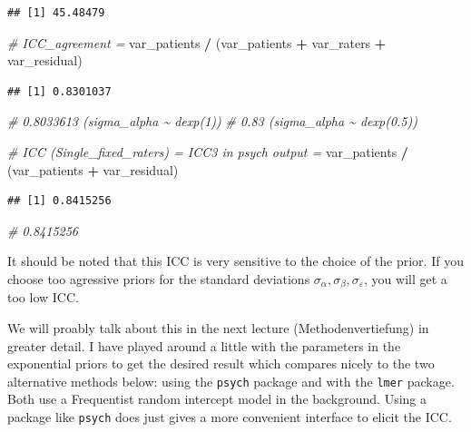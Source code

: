 \documentclass[
]{book}
\newenvironment{Shaded}{\begin{snugshade}}{\end{snugshade}}
\newcommand{\CommentTok}[1]{\textcolor[rgb]{0.56,0.35,0.01}{\textit{#1}}}
\newcommand{\NormalTok}[1]{#1}
\newcommand{\SpecialCharTok}[1]{\textcolor[rgb]{0.81,0.36,0.00}{\textbf{#1}}}
\begin{document}
\begin{verbatim}
## [1] 45.48479
\end{verbatim}

\begin{Shaded}
\begin{Highlighting}[]
\CommentTok{\# ICC\_agreement = }
\NormalTok{var\_patients }\SpecialCharTok{/}\NormalTok{ (var\_patients }\SpecialCharTok{+}\NormalTok{ var\_raters }\SpecialCharTok{+}\NormalTok{ var\_residual)}
\end{Highlighting}
\end{Shaded}

\begin{verbatim}
## [1] 0.8301037
\end{verbatim}

\begin{Shaded}
\begin{Highlighting}[]
\CommentTok{\# 0.8033613 (sigma\_alpha \textasciitilde{} dexp(1))}
\CommentTok{\# 0.83 (sigma\_alpha \textasciitilde{} dexp(0.5))}

\CommentTok{\# ICC (Single\_fixed\_raters) = ICC3 in psych output = }
\NormalTok{var\_patients }\SpecialCharTok{/}\NormalTok{ (var\_patients }\SpecialCharTok{+}\NormalTok{ var\_residual)}
\end{Highlighting}
\end{Shaded}

\begin{verbatim}
## [1] 0.8415256
\end{verbatim}

\begin{Shaded}
\begin{Highlighting}[]
\CommentTok{\# 0.8415256}
\end{Highlighting}
\end{Shaded}

It should be noted that this ICC is very sensitive to the choice of the prior.
If you choose too agressive priors for the standard deviations \(\sigma_{\alpha},
\sigma_{\beta}, \sigma_{\varepsilon}\), you will get a too low ICC.

We will proably talk about this in the next lecture (Methodenvertiefung) in greater detail.
I have played around a little with the parameters in the exponential priors
to get the desired result which compares nicely to the two alternative methods below:
using the \texttt{psych} package and with the \texttt{lmer}
package. Both use a Frequentist random intercept model in the background.
Using a package like \texttt{psych} does just gives a more convenient interface to
elicit the ICC.
\end{document}

